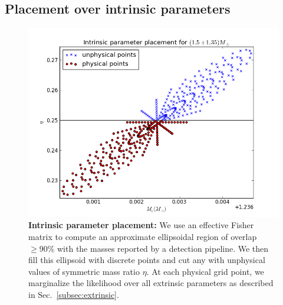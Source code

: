 
%


\subsection{Placement over intrinsic parameters}

\begin{figure}
\includegraphics[width=\columnwidth]{../Figures/linear_ellipse_placement.png}
\caption{\label{fig:linear_ellipse} \textbf{Intrinsic parameter placement:} We use an effective Fisher matrix to compute
an approximate ellipsoidal region of overlap $\geq 90\%$ with the masses reported by a detection pipeline.
We then fill this ellipsoid with discrete points and cut any with unphysical values of symmetric mass ratio $\eta$.
At each physical grid point, we marginalize the likelihood over all extrinsic parameters as described in
Sec.~\ref{subsec:extrinsic}.}
\end{figure}

